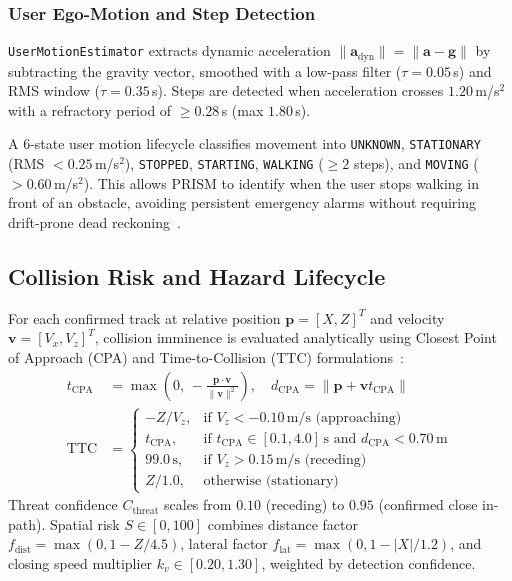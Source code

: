 \subsubsection{User Ego-Motion and Step Detection}
\texttt{UserMotionEstimator} extracts dynamic acceleration $\|\mathbf{a}_{\text{dyn}}\| = \|\mathbf{a} - \mathbf{g}\|$ by subtracting the gravity vector, smoothed with a low-pass filter ($\tau = 0.05$\,s) and RMS window ($\tau = 0.35$\,s). Steps are detected when acceleration crosses $1.20$\,m/s$^2$ with a refractory period of $\ge 0.28$\,s (max $1.80$\,s).

A 6-state user motion lifecycle classifies movement into \texttt{UNKNOWN}, \texttt{STATIONARY} (RMS $< 0.25$\,m/s$^2$), \texttt{STOPPED}, \texttt{STARTING}, \texttt{WALKING} ($\ge 2$ steps), and \texttt{MOVING} ($> 0.60$\,m/s$^2$). This allows PRISM to identify when the user stops walking in front of an obstacle, avoiding persistent emergency alarms without requiring drift-prone dead reckoning~\cite{harle2013survey}.



\subsection{Collision Risk and Hazard Lifecycle}
\label{sec:impl_collision}
For each confirmed track at relative position $\mathbf{p} = [X, Z]^T$ and velocity $\mathbf{v} = [V_x, V_z]^T$, collision imminence is evaluated analytically using Closest Point of Approach (CPA) and Time-to-Collision (TTC) formulations~\cite{hayward1972characteristics,tam2009review,lee1976theory}:
\begin{align}
t_{\text{CPA}} &= \max\left(0, \, -\frac{\mathbf{p} \cdot \mathbf{v}}{\|\mathbf{v}\|^2}\right), \quad d_{\text{CPA}} = \|\mathbf{p} + \mathbf{v} t_{\text{CPA}}\| \label{eq:cpa} \\
\text{TTC} &= \begin{cases}
-Z / V_z, & \text{if } V_z < -0.10\,\text{m/s} \text{ (approaching)} \\
t_{\text{CPA}}, & \text{if } t_{\text{CPA}} \in [0.1, 4.0]\,\text{s} \text{ and } d_{\text{CPA}} < 0.70\,\text{m} \\
99.0\,\text{s}, & \text{if } V_z > 0.15\,\text{m/s} \text{ (receding)} \\
Z / 1.0, & \text{otherwise (stationary)}
\end{cases} \label{eq:ttc}
\end{align}
Threat confidence $C_{\text{threat}}$ scales from $0.10$ (receding) to $0.95$ (confirmed close in-path). Spatial risk $S \in [0, 100]$ combines distance factor $f_{\text{dist}} = \max(0, 1 - Z/4.5)$, lateral factor $f_{\text{lat}} = \max(0, 1 - |X|/1.2)$, and closing speed multiplier $k_v \in [0.20, 1.30]$, weighted by detection confidence.

